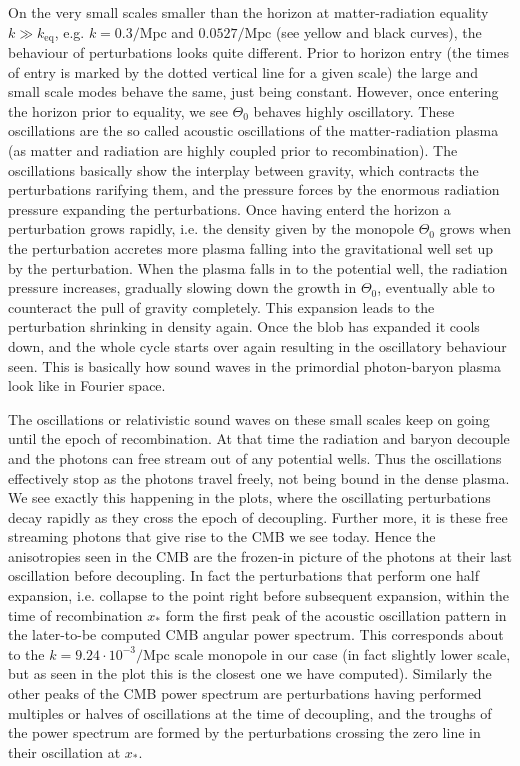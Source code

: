 \documentclass[twocolumn]{aastex62}
\begin{document}
On the very small scales smaller than the horizon at matter-radiation equality$k \gg k_\text{eq}$, e.g. $k = 0.3 /\mathrm{Mpc}$ and $0.0527 /\mathrm{Mpc}$ (see yellow and black curves), the behaviour of perturbations looks quite different. Prior to horizon entry (the times of entry is marked by the dotted vertical line for a given scale) the large and small scale modes behave the same, just being constant. However, once entering the horizon prior to equality, we see $\Theta_0$ behaves highly oscillatory. These oscillations are the so called acoustic oscillations of the matter-radiation plasma (as matter and radiation are highly coupled prior to recombination). The oscillations basically show the interplay between gravity, which contracts the perturbations rarifying them, and the pressure forces by the enormous radiation pressure expanding the perturbations. Once having enterd the horizon a perturbation grows rapidly, i.e. the density given by the monopole $\Theta_0$ grows when the perturbation accretes more plasma falling into the gravitational well set up by the perturbation. When the plasma falls in to the potential well, the radiation pressure increases, gradually slowing down the growth in $\Theta_0$, eventually able to counteract the pull of gravity completely. This expansion leads to the perturbation shrinking in density again. Once the blob has expanded it cools down, and the whole cycle starts over again resulting in the oscillatory behaviour seen. This is basically how sound waves in the primordial photon-baryon plasma look like in Fourier space.

The oscillations or relativistic sound waves on these small scales keep on going until the epoch of recombination. At that time the radiation and baryon decouple and the photons can free stream out of any potential wells. Thus the oscillations effectively stop as the photons travel freely, not being bound in the dense plasma. We see exactly this happening in the plots, where the oscillating perturbations decay rapidly as they cross the epoch of decoupling. Further more, it is these free streaming photons that give rise to the CMB we see today. Hence the anisotropies seen in the CMB are the frozen-in picture of the photons at their last oscillation before decoupling. In fact the perturbations that perform one half expansion, i.e. collapse to the point right before subsequent expansion, within the time of recombination $x_*$ form the first peak of the acoustic oscillation pattern in the later-to-be computed CMB angular power spectrum. This corresponds about to the $k = 9.24\cdot 10^{-3}/\mathrm{Mpc}$ scale monopole in our case (in fact slightly lower scale, but as seen in the plot this is the closest one we have computed). Similarly the other peaks of the CMB power spectrum are perturbations having performed multiples or halves of oscillations at the time of decoupling, and the troughs of the power spectrum are formed by the perturbations crossing the zero line in their oscillation at $x_*$.
\end{document}
